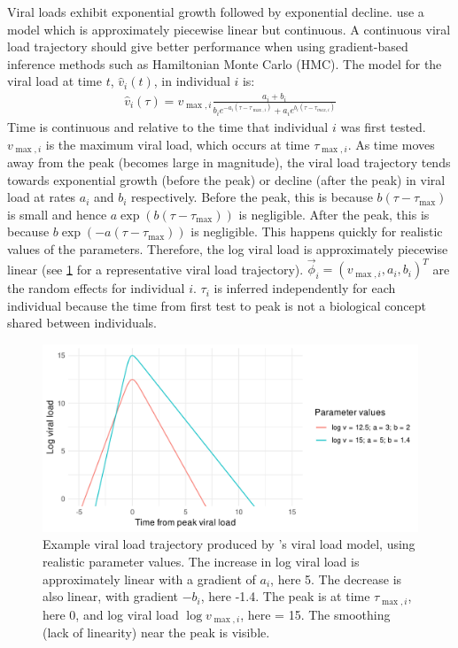 \documentclass[thesis.tex]{subfiles}
\begin{document}
Viral loads exhibit exponential growth followed by exponential decline.
\Textcite{hakkiOnset} use a model which is approximately piecewise linear but continuous.
A continuous viral load trajectory should give better performance when using gradient-based inference methods such as Hamiltonian Monte Carlo (HMC).
The model for the viral load at time $t$, $\hat{v}_i(t)$, in individual $i$ is:
\begin{align}
\hat{v}_i(\tau) = v_{\max,i} \frac{a_i+b_i}{b_ie^{-a_i(\tau-\tau_{\max,i})} + a_ie^{b_i(\tau-\tau_{max,i})}} \label{ATACCC:eq:viral-load}
\end{align}
Time is continuous and relative to the time that individual $i$ was first tested.
$v_{\max,i}$ is the maximum viral load, which occurs at time $\tau_{\max,i}$.
As time moves away from the peak (\ie becomes large in magnitude), the viral load trajectory tends towards exponential growth (before the peak) or decline (after the peak) in viral load at rates $a_i$ and $b_i$ respectively.
Before the peak, this is because $b(\tau-\tau_{\max})$ is small and hence $a\exp(b(\tau-\tau_{\max}))$ is negligible.
After the peak, this is because $b\exp(-a(\tau-\tau_{\max}))$ is negligible.
This happens quickly for realistic values of the parameters.
Therefore, the log viral load is approximately piecewise linear (see \cref{ATACCC:fig:viral-load-model} for a representative viral load trajectory).
$\vec{\phi}_i = (v_{\max,i}, a_i, b_i)^T$ are the random effects for individual $i$.
$\tau_i$ is inferred independently for each individual because the time from first test to peak is not a biological concept shared between individuals.
\begin{figure}
  \centering \includegraphics{ATACCC/typical_trajectory}
  \caption[Example viral load model trajectory.]{Example viral load trajectory produced by \textcite{hakkiOnset}'s viral load model, using realistic parameter values. The increase in log viral load is approximately linear with a gradient of $a_i$, here 5. The decrease is also linear, with gradient $-b_i$, here -1.4. The peak is at time $\tau_{\max,i}$, here 0, and log viral load $\log v_{\max,i}$, here = 15. The smoothing (lack of linearity) near the peak is visible. \label{ATACCC:fig:viral-load-model}}
\end{figure}
\end{document}
